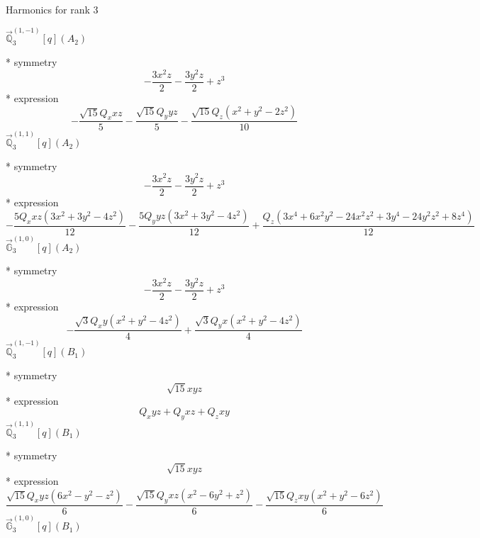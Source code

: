 \documentclass[fleqn,8pt]{jsarticle}
\begin{document}
\noindent * Harmonics for rank 3

\noindent\quad $\vec{\mathbb{Q}}_{3}^{(1,-1)}[q](A_{2})$

\noindent\quad ** symmetry
\begin{dmath*}
- \frac{3 x^{2} z}{2} - \frac{3 y^{2} z}{2} + z^{3}
\end{dmath*}
\noindent\quad ** expression
\begin{dmath*}
- \frac{\sqrt{15} Q_{x} x z}{5} - \frac{\sqrt{15} Q_{y} y z}{5} - \frac{\sqrt{15} Q_{z} \left(x^{2} + y^{2} - 2 z^{2}\right)}{10}
\end{dmath*}
\noindent\quad $\vec{\mathbb{Q}}_{3}^{(1,1)}[q](A_{2})$

\noindent\quad ** symmetry
\begin{dmath*}
- \frac{3 x^{2} z}{2} - \frac{3 y^{2} z}{2} + z^{3}
\end{dmath*}
\noindent\quad ** expression
\begin{dmath*}
- \frac{5 Q_{x} x z \left(3 x^{2} + 3 y^{2} - 4 z^{2}\right)}{12} - \frac{5 Q_{y} y z \left(3 x^{2} + 3 y^{2} - 4 z^{2}\right)}{12} + \frac{Q_{z} \left(3 x^{4} + 6 x^{2} y^{2} - 24 x^{2} z^{2} + 3 y^{4} - 24 y^{2} z^{2} + 8 z^{4}\right)}{12}
\end{dmath*}
\noindent\quad $\vec{\mathbb{G}}_{3}^{(1,0)}[q](A_{2})$

\noindent\quad ** symmetry
\begin{dmath*}
- \frac{3 x^{2} z}{2} - \frac{3 y^{2} z}{2} + z^{3}
\end{dmath*}
\noindent\quad ** expression
\begin{dmath*}
- \frac{\sqrt{3} Q_{x} y \left(x^{2} + y^{2} - 4 z^{2}\right)}{4} + \frac{\sqrt{3} Q_{y} x \left(x^{2} + y^{2} - 4 z^{2}\right)}{4}
\end{dmath*}
\noindent\quad $\vec{\mathbb{Q}}_{3}^{(1,-1)}[q](B_{1})$

\noindent\quad ** symmetry
\begin{dmath*}
\sqrt{15} x y z
\end{dmath*}
\noindent\quad ** expression
\begin{dmath*}
Q_{x} y z + Q_{y} x z + Q_{z} x y
\end{dmath*}
\noindent\quad $\vec{\mathbb{Q}}_{3}^{(1,1)}[q](B_{1})$

\noindent\quad ** symmetry
\begin{dmath*}
\sqrt{15} x y z
\end{dmath*}
\noindent\quad ** expression
\begin{dmath*}
\frac{\sqrt{15} Q_{x} y z \left(6 x^{2} - y^{2} - z^{2}\right)}{6} - \frac{\sqrt{15} Q_{y} x z \left(x^{2} - 6 y^{2} + z^{2}\right)}{6} - \frac{\sqrt{15} Q_{z} x y \left(x^{2} + y^{2} - 6 z^{2}\right)}{6}
\end{dmath*}
\noindent\quad $\vec{\mathbb{G}}_{3}^{(1,0)}[q](B_{1})$
\end{document}
